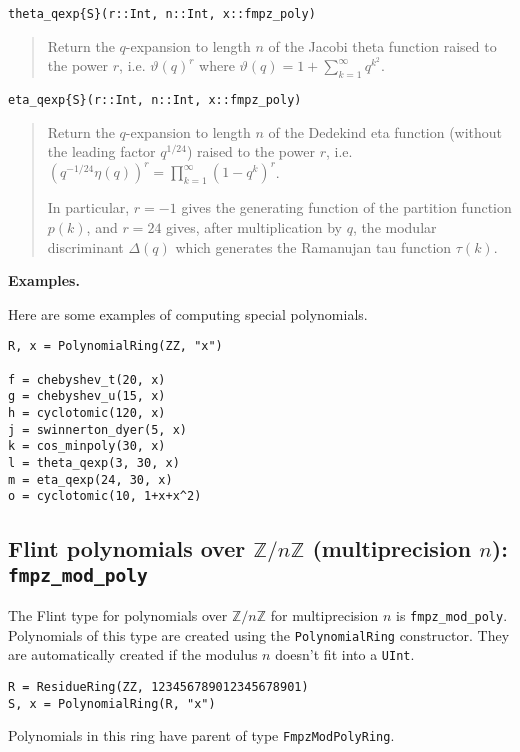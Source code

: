 \documentclass[a4paper,10pt]{article}
\newcommand{\Z}{\mathbb{Z}}
\newcommand{\code}{\lstinline}
\newcommand{\desc}[1]{\vspace{-3mm}\begin{quote}#1\end{quote}}
\begin{document}
{{\begin{lstlisting}
theta_qexp{S}(r::Int, n::Int, x::fmpz_poly)
\end{lstlisting}

\desc{Return the $q$-expansion to length $n$ of the Jacobi theta function raised to 
the power $r$, i.e. $\vartheta(q)^r$ where 
$\vartheta(q) = 1 + \sum_{k=1}^{\infty} q^{k^2}$.}

\begin{lstlisting}
eta_qexp{S}(r::Int, n::Int, x::fmpz_poly)
\end{lstlisting}

\desc{Return the $q$-expansion to length $n$ of the Dedekind eta function (without 
the leading factor $q^{1/24}$) raised to the power $r$, i.e. $(q^{-1/24} \eta(q))^r 
= \prod_{k=1}^{\infty} (1 - q^k)^r$.

In particular, $r = -1$ gives the generating function of the partition function $p(k)$, 
and $r = 24$ gives, after multiplication by $q$, the modular discriminant $\Delta(q)$ 
which generates the Ramanujan tau function $\tau(k)$.}

\textbf{Examples.}

Here are some examples of computing special polynomials.

\begin{lstlisting}
R, x = PolynomialRing(ZZ, "x")

f = chebyshev_t(20, x)
g = chebyshev_u(15, x)
h = cyclotomic(120, x)
j = swinnerton_dyer(5, x)
k = cos_minpoly(30, x)
l = theta_qexp(3, 30, x)
m = eta_qexp(24, 30, x)
o = cyclotomic(10, 1+x+x^2)
\end{lstlisting}

\subsection{Flint polynomials over $\Z/n\Z$ (multiprecision $n$): \code{fmpz_mod_poly}}

The Flint type for polynomials over $\Z/n\Z$ for multiprecision $n$ is \code{fmpz_mod_poly}.
Polynomials of this type are created using the \code{PolynomialRing} constructor. They are
automatically created if the modulus $n$ doesn't fit into a \code{UInt}.

\begin{lstlisting}
R = ResidueRing(ZZ, 123456789012345678901)
S, x = PolynomialRing(R, "x")
\end{lstlisting}

Polynomials in this ring have parent of type \code{FmpzModPolyRing}.

}}
\end{document}
